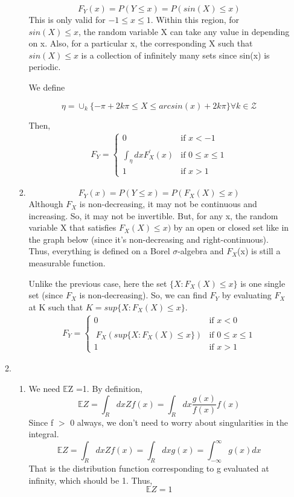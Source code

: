 \documentclass[a4paper,11pt]{article}
\begin{document}
\begin{enumerate}
\begin{enumerate}
\begin{enumerate}
\[F_Y(x)=P(Y\leq x)=P(sin(X)\leq x)\]
This is only valid for $-1\leq x \leq 1$.
Within this region, for $sin(X)\leq x$, the random variable X can take any value in  depending on x.
Also, for a particular x, the corresponding X such that $sin(X)\leq x$ is a collection of infinitely many sets since sin(x) is periodic.

We define

\[ \eta = \cup_k \{-\pi + 2k\pi  \leq X \leq arcsin(x) + 2k\pi\} \forall k \in  \mathcal{Z}  \]

 Then,
 \begin{align*}
  F_Y = \begin{cases}
      0 & \text{if $x<-1$} \\
       \\\int_{\eta} dx F_X^{'}(x) & \text{if $0\leq x\leq 1$}
       \\
       1 & \text{if $x > 1$}
    \end{cases}
\end{align*}
\item
\[F_Y(x)=P(Y\leq x)=P(F_X(X)\leq x)\]
Although $F_X$ is non-decreasing, it may not be continuous and increasing. 
So, it may not be invertible. But, for any x, the random variable X that satisfies
$F_X(X)\leq x)$ by an open or closed set like in the graph below (since it's non-decreasing and
right-continuous). Thus, everything is defined on a Borel $\sigma$-algebra and $F_X$(x) is still a measurable function.
\newpage

Unlike the previous case, here the set $\{X: F_X(X) \leq x\}$ is one single set (since $F_X$ is 
non-decreasing). So, we can find $F_Y$ by evaluating $F_X$ at K such that $K = sup\{X: F_X(X) \leq x\}$.
 \begin{align*}
  F_Y = \begin{cases}
      0 & \text{if $x<0$} \\
       \\\ F_X(sup\{X: F_X(X) \leq x\}) & \text{if $0\leq x\leq 1$}
       \\
       1 & \text{if $x > 1$}
    \end{cases}
\end{align*}

 \end{enumerate}

\item 
\begin{enumerate}
 \item 
We need $\mathbb{E}$Z =1.
By definition,
\[\mathbb{E}Z = \int_R dx Z f(x)= \int_R dx \frac{g(x)}{f(x)} f(x)\]
Since f $>$ 0 always, we don't need to worry about singularities in the integral.
\[\mathbb{E}Z = \int_R dx Z f(x)= \int_R dx  g(x) = \int_{-\infty}^{\infty} g(x)dx\]
That is the distribution function corresponding to g evaluated at infinity, which should be 1. Thus,
\[\mathbb{E}Z =1\]


\end{enumerate}
\end{enumerate}
\end{enumerate}
\end{document}
